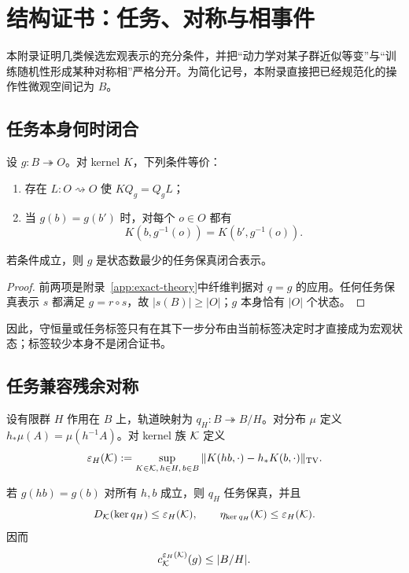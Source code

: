 \section{结构证书：任务、对称与相事件}
\label{app:structural-certificates}

本附录证明几类候选宏观表示的充分条件，并把“动力学对某子群近似等变”与“训练随机性形成某种对称相”严格分开。为简化记号，本附录直接把已经规范化的操作性微观空间记为 $B$。

\subsection{任务本身何时闭合}

\begin{proposition}[任务充分性]
\label{prop:task-sufficiency}
设 $g:B\twoheadrightarrow O$。对 kernel $K$，下列条件等价：
\begin{enumerate}
  \item 存在 $L:O\rightsquigarrow O$ 使 $KQ_g=Q_gL$；
  \item 当 $g(b)=g(b')$ 时，对每个 $o\in O$ 都有
  \[
  K(b,g^{-1}(o))=K(b',g^{-1}(o)).
  \]
\end{enumerate}
若条件成立，则 $g$ 是状态数最少的任务保真闭合表示。
\end{proposition}

\begin{proof}
前两项是附录~\ref{app:exact-theory}中纤维判据对 $q=g$ 的应用。任何任务保真表示 $s$ 都满足 $g=r\circ s$，故 $|s(B)|\ge|O|$；$g$ 本身恰有 $|O|$ 个状态。
\end{proof}

因此，守恒量或任务标签只有在其下一步分布由当前标签决定时才直接成为宏观状态；标签较少本身不是闭合证书。

\subsection{任务兼容残余对称}

设有限群 $H$ 作用在 $B$ 上，轨道映射为 $q_H:B\twoheadrightarrow B/H$。对分布 $\mu$ 定义 $h_*\mu(A)=\mu(h^{-1}A)$。对 kernel 族 $\mathcal K$ 定义
\[
\varepsilon_H(\mathcal K)
:=
\sup_{K\in\mathcal K,\,h\in H,\,b\in B}
\|K(hb,\cdot)-h_*K(b,\cdot)\|_{\operatorname{TV}}.
\]

\begin{theorem}[残余对称闭合证书]
\label{thm:symmetry-certificate-app}
若 $g(hb)=g(b)$ 对所有 $h,b$ 成立，则 $q_H$ 任务保真，并且
\[
D_{\mathcal K}(\ker q_H)
\le \varepsilon_H(\mathcal K),
\qquad
\eta_{\ker q_H}(\mathcal K)
\le \varepsilon_H(\mathcal K).
\]
因而
\[
c_{\mathcal K}^{\varepsilon_H(\mathcal K)}(g)\le |B/H|.
\]
\end{theorem}

